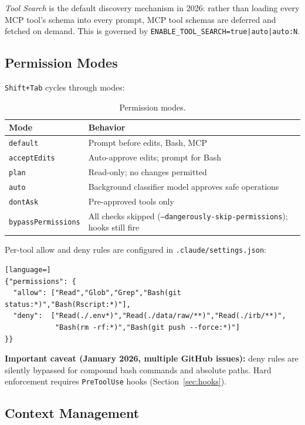 \documentclass[11pt]{article}
\begin{document}
\emph{Tool Search} is the default discovery mechanism in 2026: rather than loading every MCP tool's schema into every prompt, MCP tool schemas are deferred and fetched on demand. This is governed by \texttt{ENABLE\_TOOL\_SEARCH=true|auto|auto:N}.

\subsection{Permission Modes}

\texttt{Shift+Tab} cycles through modes:

\begin{table}[h]
\centering
\small
\begin{tabular}{@{}ll@{}}
\toprule
\textbf{Mode} & \textbf{Behavior} \\
\midrule
\texttt{default} & Prompt before edits, Bash, MCP \\
\texttt{acceptEdits} & Auto-approve edits; prompt for Bash \\
\texttt{plan} & Read-only; no changes permitted \\
\texttt{auto} & Background classifier model approves safe operations \\
\texttt{dontAsk} & Pre-approved tools only \\
\texttt{bypassPermissions} & All checks skipped (\texttt{--dangerously-skip-permissions}); hooks still fire \\
\bottomrule
\end{tabular}
\caption{Permission modes.}
\end{table}

Per-tool allow and deny rules are configured in \texttt{.claude/settings.json}:

\begin{lstlisting}[language=]
{"permissions": {
  "allow": ["Read","Glob","Grep","Bash(git status:*)","Bash(Rscript:*)"],
  "deny":  ["Read(./.env*)","Read(./data/raw/**)","Read(./irb/**)",
            "Bash(rm -rf:*)","Bash(git push --force:*)"]
}}
\end{lstlisting}

\textbf{Important caveat (January 2026, multiple GitHub issues):} deny rules are silently bypassed for compound bash commands and absolute paths. Hard enforcement requires \texttt{PreToolUse} hooks (Section~\ref{sec:hooks}).

\subsection{Context Management}
\end{document}

